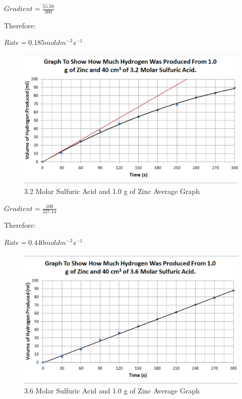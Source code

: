 $Gradient = \frac{55.50}{300}$

Therefore:

$Rate = 0.185 mol dm^{-3} s^{-1}$

\begin{figure}[H]
    \includegraphics[width=\textwidth]{./Analysis/Images/1NonCatalyst/32Molar.pdf}
    \caption{3.2 Molar Sulfuric Acid and 1.0 g of Zinc Average Graph} \label{fig:32MolarSAGradient}
\end{figure}

$Gradient = \frac{100}{227.14}$

Therefore:

$Rate = 0.440 mol dm^{-3} s^{-1}$

\begin{figure}[H]
    \includegraphics[width=\textwidth]{./Analysis/Images/1NonCatalyst/36Molar.pdf}
    \caption{3.6 Molar Sulfuric Acid and 1.0 g of Zinc Average Graph} \label{fig:36MolarSAGradient}
\end{figure}

